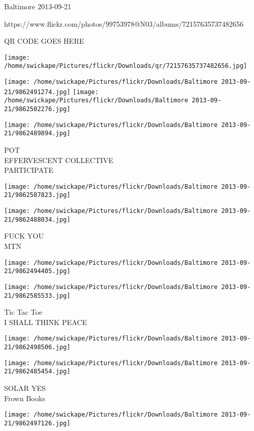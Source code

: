 \documentclass[10pt,letterpaper]{article}
\begin{document}
Baltimore 2013-09-21

https://www.flickr.com/photos/99753978@N03/albums/72157635737482656

QR CODE GOES HERE

\texttt{[image: /home/swickape/Pictures/flickr/Downloads/qr/72157635737482656.jpg]}
\pagebreak

\texttt{[image: /home/swickape/Pictures/flickr/Downloads/Baltimore 2013-09-21/9862491274.jpg]}
\texttt{[image: /home/swickape/Pictures/flickr/Downloads/Baltimore 2013-09-21/9862502276.jpg]}

\texttt{[image: /home/swickape/Pictures/flickr/Downloads/Baltimore 2013-09-21/9862489894.jpg]}

POT\\
EFFERVESCENT COLLECTIVE\\
PARTICIPATE\\
\pagebreak

\texttt{[image: /home/swickape/Pictures/flickr/Downloads/Baltimore 2013-09-21/9862587823.jpg]}

\vspace{0.25in}
\texttt{[image: /home/swickape/Pictures/flickr/Downloads/Baltimore 2013-09-21/9862488034.jpg]}

FUCK YOU\\
MTN\\
\pagebreak

\texttt{[image: /home/swickape/Pictures/flickr/Downloads/Baltimore 2013-09-21/9862494405.jpg]}

\vspace{0.25in}
\texttt{[image: /home/swickape/Pictures/flickr/Downloads/Baltimore 2013-09-21/9862585533.jpg]}

Tic Tac Toe\\
I SHALL THINK PEACE\\
\pagebreak

\texttt{[image: /home/swickape/Pictures/flickr/Downloads/Baltimore 2013-09-21/9862498506.jpg]}

\vspace{0.25in}
\texttt{[image: /home/swickape/Pictures/flickr/Downloads/Baltimore 2013-09-21/9862485454.jpg]}

SOLAR YES\\
Frown Books\\
\pagebreak

\texttt{[image: /home/swickape/Pictures/flickr/Downloads/Baltimore 2013-09-21/9862497126.jpg]}
\end{document}
